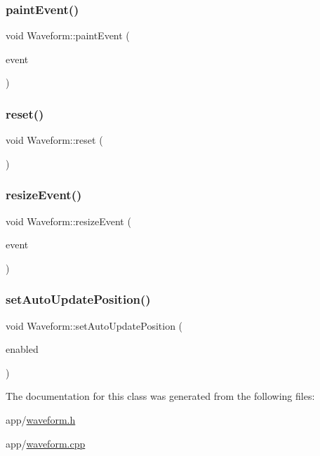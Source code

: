 \subsubsection{\texorpdfstring{paint\+Event()}{paintEvent()}}
{\footnotesize\ttfamily void Waveform\+::paint\+Event (\begin{DoxyParamCaption}\item[{Q\+Paint\+Event $\ast$}]{event }\end{DoxyParamCaption})}

\hypertarget{class_waveform_ae97ba3abb25987f5df0b237850be5ec7}{}\label{class_waveform_ae97ba3abb25987f5df0b237850be5ec7} 
\subsubsection{\texorpdfstring{reset()}{reset()}}
{\footnotesize\ttfamily void Waveform\+::reset (\begin{DoxyParamCaption}{ }\end{DoxyParamCaption})}

\hypertarget{class_waveform_a3d814bfdf6ec4d47e80e34685c2fa464}{}\label{class_waveform_a3d814bfdf6ec4d47e80e34685c2fa464} 
\subsubsection{\texorpdfstring{resize\+Event()}{resizeEvent()}}
{\footnotesize\ttfamily void Waveform\+::resize\+Event (\begin{DoxyParamCaption}\item[{Q\+Resize\+Event $\ast$}]{event }\end{DoxyParamCaption})}

\hypertarget{class_waveform_aa57d2fa418d6ac920de5b81e8ec9e6fc}{}\label{class_waveform_aa57d2fa418d6ac920de5b81e8ec9e6fc} 
\subsubsection{\texorpdfstring{set\+Auto\+Update\+Position()}{setAutoUpdatePosition()}}
{\footnotesize\ttfamily void Waveform\+::set\+Auto\+Update\+Position (\begin{DoxyParamCaption}\item[{bool}]{enabled }\end{DoxyParamCaption})}



The documentation for this class was generated from the following files\+:\begin{DoxyCompactItemize}
\item 
app/\hyperlink{waveform_8h}{waveform.\+h}\item 
app/\hyperlink{waveform_8cpp}{waveform.\+cpp}\end{DoxyCompactItemize}
